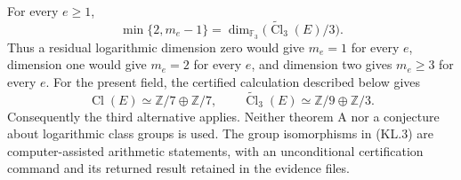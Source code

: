 \begin{proposition}
\label{AC-K13}
For every $e\geq1$,
\[
 \min\{2,m_e-1\}
 =\dim_{\mathbb F_3}\bigl(
       \widetilde{\operatorname{Cl}}_3(E)/3\bigr).       \tag{KL.2}
\]
Thus a residual logarithmic dimension zero would give $m_e=1$
for every $e$, dimension one would give $m_e=2$ for every $e$,
and dimension two gives $m_e\geq3$ for every $e$.
For the present field, the certified calculation described below gives
\[
 \operatorname{Cl}(E)\simeq\mathbb Z/7\oplus\mathbb Z/7,
 \qquad
 \widetilde{\operatorname{Cl}}_3(E)
       \simeq\mathbb Z/9\oplus\mathbb Z/3.             \tag{KL.3}
\]
Consequently the third alternative applies.  Neither theorem A
nor a conjecture about logarithmic class groups is used.
The group isomorphisms in (KL.3) are computer-assisted arithmetic
statements, with an unconditional certification command and its
returned result retained in the evidence files.
\end{proposition}
